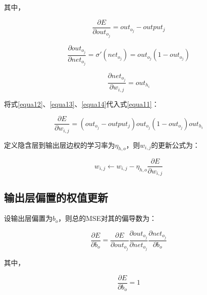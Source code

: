 \documentclass[forprint]{WHUBachelor}
\begin{document}
         其中，
   
         \begin{equation}
           \frac{\partial{E}}{\partial{out_{o_j}}}
           =out_{o_j}-output_j
           \label{equa12}
         \end{equation}
   
         \begin{equation}
           \frac{\partial{out_{o_j}}}{\partial{net_{o_j}}}
           =\sigma'(net_{o_j})
           =out_{o_j}(1-out_{o_j})
           \label{equa13}
         \end{equation}
   
         \begin{equation}
           \frac{\partial{net_{o_j}}}{\partial{w_{i,j}}}
           =out_{h_i}
           \label{equa14}
         \end{equation}
   
         将式\ref{equa12}、\ref{equa13}、\ref{equa14}代入式\ref{equa11}：
         
         \begin{equation}
           \frac{\partial{E}}{\partial{w_{i,j}}}=
           (out_{o_j}-output_j)out_{o_j}(1-out_{o_j})out_{h_i}
         \end{equation}
   
         定义隐含层到输出层边权的学习率为$\eta_{h,o}$，则$w_{i,j}$的更新公式为：
   
         \begin{equation}
           w_{i,j}\gets w_{i,j}-\eta_{h,o}\frac{\partial{E}}{\partial{w_{i,j}}}
         \end{equation}
       
       \subsection{输出层偏置的权值更新}
         设输出层偏置为$b_o$，则总的MSE对其的偏导数为：
   
         \begin{equation}
           \frac{\partial{E}}{\partial{b_o}}=
           \frac{\partial{E}}{\partial{out_{o_j}}}
           \frac{\partial{out_{o_j}}}{\partial{net_{o_j}}}
           \frac{\partial{net_{o_j}}}{\partial{b_o}}
           \label{equa21}
         \end{equation}
   
         其中，
   
         \begin{equation}
           \frac{\partial{E}}{\partial{b_o}}=1
           \label{equa22}
         \end{equation}
   
\end{document}
